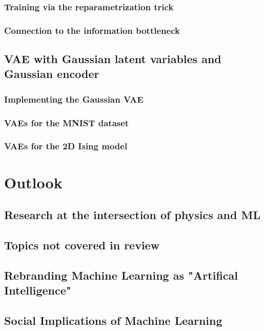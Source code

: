 \documentclass[norsk,a4paper,11pt]{article}
\begin{document}
\subsubsection{Training via the reparametrization trick}
\subsubsection{Connection to the information bottleneck}

\subsection{VAE with Gaussian latent variables and Gaussian encoder}
\subsubsection{Implementing the Gaussian VAE}
\subsubsection{VAEs for the MNIST dataset}
\subsubsection{VAEs for the 2D Ising model}



\section{Outlook}
\subsection{Research at the intersection of physics and ML}
\subsection{Topics not covered in review}
\subsection{Rebranding Machine Learning as "Artifical Intelligence"}
\subsection{Social Implications of Machine Learning}
\end{document}
